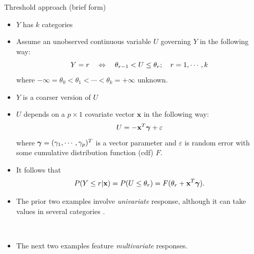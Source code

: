 \documentclass{beamer}
\begin{document}
\begin{frame}{Threshold approach (brief form)}
\begin{itemize}
\item $Y$ has $k$ categories
\item Assume an unobserved continuous variable $U$ governing $Y$ in  the following way: \vspace*{-3pt}
$$Y=r \quad\Leftrightarrow\quad \theta_{r-1}<U\leq \theta_r; \quad r=1,\cdots,k \vspace*{-3pt}$$ 
where $-\infty=\theta_0<\theta_1<\cdots <\theta_k=+\infty$ unknown.
 \item $Y$ is a coarser version of $U$

\item
 $U$ depends on a $p\times 1$  covariate vector $\textbf{x}$ in the following way: \vspace*{-5pt}
$$U=-\textbf{x}^T\mbox{\boldmath $\gamma$}+\varepsilon$$
where $\mbox{\boldmath $\gamma$}=(\gamma_1,\cdots,\gamma_p)^T$ is a vector
parameter and $\varepsilon$ is random error with some cumulative distribution function (cdf) $F$.
\item
It follows that \vspace*{-5pt}
$$P(Y\leq r |\textbf{x})=P(U\leq \theta_r)=F(\theta_r+\textbf{x}^T\mbox{\boldmath $\gamma$}). \vspace*{-3pt}$$
\end{itemize}
\end{frame}

\begin{frame}
\begin{itemize}
\item The prior two examples involve \emph{univariate} response, although it can take values in several categories .  

\ \

\item The next two examples feature \emph{multivariate} responses. 
\end{itemize}
\end{frame}
\end{document}
